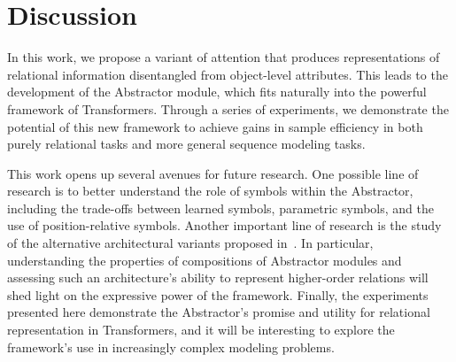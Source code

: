 \section{Discussion}\label{sec:discuss}


In this work, we propose a variant of attention that produces representations of relational information disentangled from object-level attributes. This leads to the development of the Abstractor module, which fits naturally into the powerful framework of Transformers. Through a series of experiments, we demonstrate the potential of this new framework to achieve gains in sample efficiency in both purely relational tasks and more general sequence modeling tasks.

This work opens up several avenues for future research. One possible line of research is to better understand the role of symbols within the Abstractor, including the trade-offs between learned symbols, parametric symbols, and the use of position-relative symbols. Another important line of research is the study of the alternative architectural variants proposed in~. In particular, understanding the properties of compositions of Abstractor modules and assessing such an architecture's ability to represent higher-order relations will shed light on the expressive power of the framework. Finally, the experiments presented here demonstrate the Abstractor's promise and utility for relational representation in Transformers, and it will be interesting to explore the framework's use in increasingly complex modeling problems. 